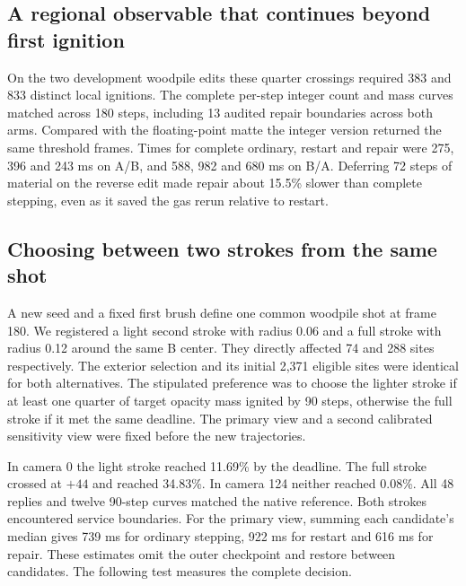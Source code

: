 \subsection{A regional observable that continues beyond first ignition}
On the two development woodpile edits these quarter crossings required 383 and 833 distinct local ignitions. The complete per-step integer count and mass curves matched across 180 steps, including 13 audited repair boundaries across both arms. Compared with the floating-point matte the integer version returned the same threshold frames. Times for complete ordinary, restart and repair were 275, 396 and 243 ms on A/B, and 588, 982 and 680 ms on B/A. Deferring 72 steps of material on the reverse edit made repair about 15.5\% slower than complete stepping, even as it saved the gas rerun relative to restart.

\subsection{Choosing between two strokes from the same shot}
A new seed and a fixed first brush define one common woodpile shot at frame 180. We registered a light second stroke with radius 0.06 and a full stroke with radius 0.12 around the same B center. They directly affected 74 and 288 sites respectively. The exterior selection and its initial 2,371 eligible sites were identical for both alternatives. The stipulated preference was to choose the lighter stroke if at least one quarter of target opacity mass ignited by 90 steps, otherwise the full stroke if it met the same deadline. The primary view and a second calibrated sensitivity view were fixed before the new trajectories.

In camera 0 the light stroke reached 11.69\% by the deadline. The full stroke crossed at $+44$ and reached 34.83\%. In camera 124 neither reached 0.08\%. All 48 replies and twelve 90-step curves matched the native reference. Both strokes encountered service boundaries. For the primary view, summing each candidate's median gives 739 ms for ordinary stepping, 922 ms for restart and 616 ms for repair. These estimates omit the outer checkpoint and restore between candidates. The following test measures the complete decision.
